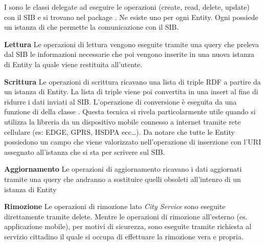 I  sono le classi delegate ad eseguire le operazioni  (create, read, delete, update) con il SIB e si trovano nel package . Ne esiste uno per ogni Entity. Ogni  possiede un istanza di  che permette la comunicazione con il SIB. 

\begin{description}
	\item \textbf{Lettura} Le operazioni di lettura vengono eseguite tramite una query  che preleva dal SIB le informazioni necessarie che poi vengono inserite in una nuova istanza di Entity la quale viene restituita all'utente.

	\item \textbf{Scrittura} Le operazioni di scrittura ricavano una lista di triple RDF a partire da un istanza di Entity. La lista di triple viene poi convertita in una  insert al fine di ridurre i dati inviati al SIB. L'operazione di conversione è eseguita da una funzione di della  classe . Questa tecnica si rivela particolarmente utile quando si utilizza la libreria da un dispositivo mobile connesso a internet tramite rete cellulare (es: EDGE, GPRS, HSDPA ecc\dots). Da notare che tutte le Entity possiedono un campo  che viene valorizzato nell'operazione di inserzione con l'URI assegnato all'istanza che si sta per scrivere sul SIB. 

	\item \textbf{Aggiornamento} Le operazioni di aggiornamento ricavano i dati aggiornati tramite una query  che andranno a sostituire quelli obsoleti all'intenro di un istanza di Entity

	\item \textbf{Rimozione} Le operazioni di rimozione lato \emph{City Service} sono eseguite direttamente tramite  delete. Mentre le operazioni di rimozione all'esterno (es. applicazione mobile), per motivi di sicurezza, sono eseguite tramite richiesta al servizio cittadino il quale si occupa di effettuare la rimozione vera e propria.
\end{description}













